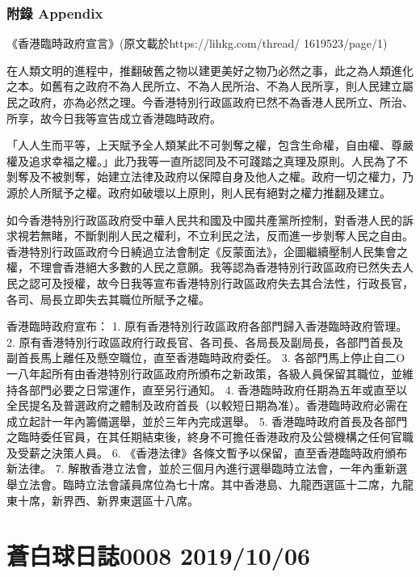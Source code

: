 \documentclass[a5paper, 12pt
]{book}
\begin{document}
\hypertarget{ux9644ux9304-appendix}{%
\subsubsection{附錄 Appendix}\label{ux9644ux9304-appendix}}

《香港臨時政府宣言》(原文載於https://lihkg.com/thread/
1619523/page/1)

在人類文明的進程中，推翻破舊之物以建更美好之物乃必然之事，此之為人類進化之本。如舊有之政府不為人民所立、不為人民所治、不為人民所享，則人民建立屬民之政府，亦為必然之理。今香港特別行政區政府已然不為香港人民所立、所治、所享，故今日我等宣告成立香港臨時政府。

「人人生而平等，上天賦予全人類某此不可剝奪之權，包含生命權，自由權、尊嚴權及追求幸福之權。」此乃我等一直所認同及不可踐踏之真理及原則。人民為了不剝奪及不被剝奪，始建立法律及政府以保障自身及他人之權。政府一切之權力，乃源於人所賦予之權。政府如破壞以上原則，則人民有絕對之權力推翻及建立。

如今香港特別行政區政府受中華人民共和國及中國共產黨所控制，對香港人民的訴求視若無睹，不斷剝削人民之權利，不立利民之法，反而進一步剝奪人民之自由。香港特別行政區政府今日繞過立法會制定《反蒙面法》，企圖繼續壓制人民集會之權，不理會香港絕大多數的人民之意願。我等認為香港特別行政區政府已然失去人民之認可及授權，故今日我等宣布香港特別行政區政府失去其合法性，行政長官，各司、局長立即失去其職位所賦予之權。

香港臨時政府宣布： 1. 原有香港特別行政區政府各部門歸入香港臨時政府管理。
2.
原有香港特別行政區政府行政長官、各司長、各局長及副局長，各部門首長及副首長馬上離任及懸空職位，直至香港臨時政府委任。
3.
各部門馬上停止自二O一八年起所有由香港特別行政區政府所頒布之新政策，各級人員保留其職位，並維持各部門必要之日常運作，直至另行通知。
4.
香港臨時政府任期為五年或直至以全民提名及普選政府之體制及政府首長（以較短日期為准）。香港臨時政府必需在成立起計一年內籌備選舉，並於三年內完成選舉。
5.
香港臨時政府首長及各部門之臨時委任官員，在其任期結束後，終身不可擔任香港政府及公營機構之任何官職及受薪之決策人員。
6. 《香港法律》各條文暫予以保留，直至香港臨時政府頒布新法律。 7.
解散香港立法會，並於三個月內進行選舉臨時立法會，一年內重新選舉立法會。臨時立法會議員席位為七十席。其中香港島、九龍西選區十二席，九龍東十席，新界西、新界東選區十八席。

\hypertarget{ux84bcux767dux7403ux65e5ux8a8c0008-20191006}{%
\section{蒼白球日誌0008
2019/10/06}\label{ux84bcux767dux7403ux65e5ux8a8c0008-20191006}}
\end{document}
